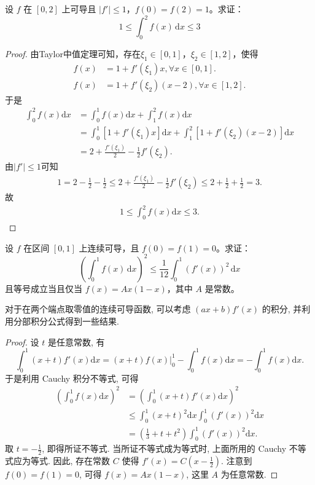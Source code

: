 \documentclass[../../main.tex]{subfiles}%
\begin{document}
\begin{example}
设 \( f \) 在 \([0,2]\) 上可导且 \(|f'| \leqslant 1\)，\( f(0) = f(2) = 1 \)。求证：
\[
1 \leqslant \int_{0}^{2} f(x) \, \mathrm{d}x \leqslant 3
\]
\end{example}
\begin{proof}
由Taylor中值定理可知，存在$\xi_1\in[0,1]$，$\xi_2\in[1,2]$，使得
\begin{align*}
f(x)&=1+f'(\xi_1)x,\forall x\in[0,1].\\
f(x)&=1+f'(\xi_2)(x-2),\forall x\in[1,2].
\end{align*}
于是
\begin{align*}
\int_0^2 f(x)\mathrm{d}x&=\int_0^1 f(x)\mathrm{d}x+\int_1^2 f(x)\mathrm{d}x\\
&=\int_0^1 [1+f'(\xi_1)x]\mathrm{d}x+\int_1^2 [1+f'(\xi_2)(x-2)]\mathrm{d}x\\
&=2+\frac{f'(\xi_1)}{2}-\frac{1}{2}f'(\xi_2).
\end{align*}
由$|f'|\leqslant1$可知
\begin{align*}
1=2-\frac{1}{2}-\frac{1}{2}\leqslant 2+\frac{f'(\xi_1)}{2}-\frac{1}{2}f'(\xi_2)\leqslant 2+\frac{1}{2}+\frac{1}{2}=3.
\end{align*}
故
\begin{align*}
1\leqslant \int_0^2 f(x)\mathrm{d}x\leqslant 3.
\end{align*}
\end{proof}

\begin{example}
设 \( f \) 在区间 \([0,1]\) 上连续可导，且 \( f(0) = f(1) = 0 \)。求证：
\[
\left( \int_{0}^{1} f(x) \, \mathrm{d}x \right)^{2} \leqslant \frac{1}{12} \int_{0}^{1} \left( f'(x) \right)^{2} \, \mathrm{d}x
\]
且等号成立当且仅当 \( f(x) = Ax(1 - x) \)，其中 \( A \) 是常数。
\end{example}
\begin{note}
对于在两个端点取零值的连续可导函数, 可以考虑 \((ax + b)f'(x)\) 的积分, 并利用分部积分公式得到一些结果.
\end{note}
\begin{proof}
设 \(t\) 是任意常数, 有
\[
\int_0^1 (x + t)f'(x)\mathrm{d}x = (x + t)f(x) \Big|_0^1 - \int_0^1 f(x)\mathrm{d}x = -\int_0^1 f(x)\mathrm{d}x.
\]
于是利用 Cauchy 积分不等式, 可得
\begin{align*}
\left(\int_0^1 f(x)\mathrm{d}x\right)^2 &= \left(\int_0^1 (x + t)f'(x)\mathrm{d}x\right)^2\\
&\leqslant \int_0^1 (x + t)^2\mathrm{d}x \int_0^1 (f'(x))^2\mathrm{d}x\\
&= \left(\frac{1}{3} + t + t^2\right)\int_0^1 (f'(x))^2\mathrm{d}x.
\end{align*}
取 \(t = -\frac{1}{2}\), 即得所证不等式. 当所证不等式成为等式时, 上面所用的 Cauchy 不等式应为等式. 因此, 存在常数 \(C\) 使得 \(f'(x) = C\left(x - \frac{1}{2}\right)\). 注意到 \(f(0) = f(1) = 0\), 可得 \(f(x) = Ax(1 - x)\), 这里 \(A\) 为任意常数.
\end{proof}
\end{document}
